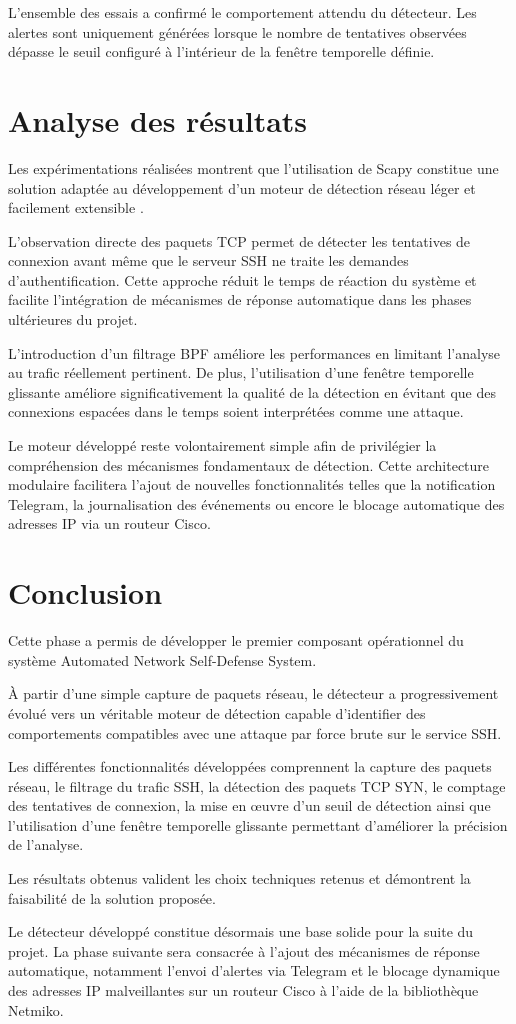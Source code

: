 L'ensemble des essais a confirmé le comportement attendu du détecteur. Les alertes sont uniquement générées lorsque le nombre de tentatives observées dépasse le seuil configuré à l'intérieur de la fenêtre temporelle définie.

\section{Analyse des résultats}

Les expérimentations réalisées montrent que l'utilisation de Scapy constitue une solution adaptée au développement d'un moteur de détection réseau léger et facilement extensible \cite{scapy_docs}.

L'observation directe des paquets TCP permet de détecter les tentatives de connexion avant même que le serveur SSH ne traite les demandes d'authentification. Cette approche réduit le temps de réaction du système et facilite l'intégration de mécanismes de réponse automatique dans les phases ultérieures du projet.

L'introduction d'un filtrage BPF améliore les performances en limitant l'analyse au trafic réellement pertinent. De plus, l'utilisation d'une fenêtre temporelle glissante améliore significativement la qualité de la détection en évitant que des connexions espacées dans le temps soient interprétées comme une attaque.

Le moteur développé reste volontairement simple afin de privilégier la compréhension des mécanismes fondamentaux de détection. Cette architecture modulaire facilitera l'ajout de nouvelles fonctionnalités telles que la notification Telegram, la journalisation des événements ou encore le blocage automatique des adresses IP via un routeur Cisco.

\section{Conclusion}

Cette phase a permis de développer le premier composant opérationnel du système Automated Network Self-Defense System.

À partir d'une simple capture de paquets réseau, le détecteur a progressivement évolué vers un véritable moteur de détection capable d'identifier des comportements compatibles avec une attaque par force brute sur le service SSH.

Les différentes fonctionnalités développées comprennent la capture des paquets réseau, le filtrage du trafic SSH, la détection des paquets TCP SYN, le comptage des tentatives de connexion, la mise en œuvre d'un seuil de détection ainsi que l'utilisation d'une fenêtre temporelle glissante permettant d'améliorer la précision de l'analyse.

Les résultats obtenus valident les choix techniques retenus et démontrent la faisabilité de la solution proposée.

Le détecteur développé constitue désormais une base solide pour la suite du projet. La phase suivante sera consacrée à l'ajout des mécanismes de réponse automatique, notamment l'envoi d'alertes via Telegram et le blocage dynamique des adresses IP malveillantes sur un routeur Cisco à l'aide de la bibliothèque Netmiko.